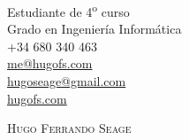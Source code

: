 \documentclass[a4paper, 11pt]{article}
\begin{document}
\pagestyle{empty} %

\begin{flushright}
    Estudiante de 4\textsuperscript{o} curso\\
    Grado en Ingeniería Informática\\
    +34 680 340 463\\
    \href{mailto: me@hugofs.com}{me@hugofs.com}\\
    \href{mailto: hugoseage@gmail.com}{hugoseage@gmail.com}\\
    \href{https://hugofs.com}{hugofs.com}\\
\end{flushright}

\vspace{-40mm}

\begin{figure}[ht!]
    \begin{flushleft}
    \end{flushleft}
\end{figure}

{\textsc {\Huge \vspace{5mm} \hspace{-13mm} Hugo Ferrando Seage}}\\
\end{document}

